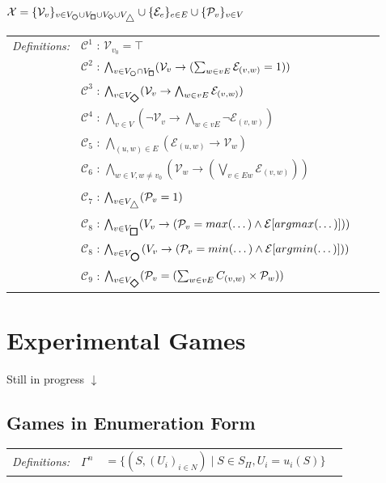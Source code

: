 \documentclass[12pt]{extarticle}
\newcommand{\definition}[1] {
    \begin{tcolorbox}[colback=mygray,colframe=mygray,sharp corners=all,top=0.01cm,bottom=0.01cm,left=0.1cm]
    \small
    \setlength{\tabcolsep}{2pt}
    \begin{tabular}{l l l l}
        \textit{Definitions:} & #1
    \end{tabular}
    \end{tcolorbox}
}
\begin{document}
$\mathcal{X} = 
    \{\mathcal{V}_v \}_{v \in V_{\submini} \cup V_{\submaxi} \cup V_{\subrand} \cup V_{\subsink}} \cup
    \{\mathcal{E}_e \}_{e \in E} \cup
    \{\mathcal{P}_v \}_{v \in V}$

\definition{
    $\mathcal{C}^{1}$ : $\mathcal{V}_{v_0} = \top$
    \\ & $\mathcal{C}^{2}$ : $\bigwedge_{v \in V_{\submini} \cap V_{\submaxi}} (\mathcal{V}_v \rightarrow (\sum_{w \in vE} \mathcal{E}_{(v,w)}= 1))$
    \\ & $\mathcal{C}^{3}$ : $\bigwedge_{v \in V_{\rand}} (\mathcal{V}_v \rightarrow \bigwedge_{w \in vE} \mathcal{E}_{(v,w)})$
    \\ & $\mathcal{C}^{4}$ : $\bigwedge_{v \in V} (\neg \mathcal{V}_v \rightarrow \bigwedge_{w \in vE} \neg \mathcal{E}_{(v,w)})$
    \\ & $\mathcal{C}_{5}$ : $\bigwedge_{(u,w) \in E} (\mathcal{E}_{(u,w)} \rightarrow \mathcal{V}_w)$
    \\ & $\mathcal{C}_{6}$ : $\bigwedge_{w \in V, w \neq v_0} (\mathcal{V}_w \rightarrow (\bigvee_{v \in Ew} \mathcal{E}_{(v,w)}))$
    \\
    \\ & $\mathcal{C}_{7}$ : $\bigwedge_{v \in V_{\sink}} (\mathcal{P}_v = 1)$
    \\ & $\mathcal{C}_{8}$ : $\bigwedge_{v \in V_{\maxi}} (V_v \rightarrow (\mathcal{P}_v = max(\dots) \wedge \mathcal{E}[argmax(\dots)]))$
    \\ & $\mathcal{C}_{8}$ : $\bigwedge_{v \in V_{\mini}} (V_v \rightarrow (\mathcal{P}_v = min(\dots) \wedge \mathcal{E}[argmin(\dots)]))$
    \\ & $\mathcal{C}_{9}$ : $\bigwedge_{v \in V_{\rand}} (\mathcal{P}_v = (\sum_{w \in vE} C_{(v,w)} \times \mathcal{P}_{w}))$

}




\section{Experimental Games}

{\color{red}Still in progress $\downarrow$ }

\subsection{Games in Enumeration Form}

\definition{
    $\Gamma^n$ &$ = \{ (S, (U_i)_{i \in N}) \mid S \in S_\Pi, U_i = u_i(S) \}$
}
\end{document}
